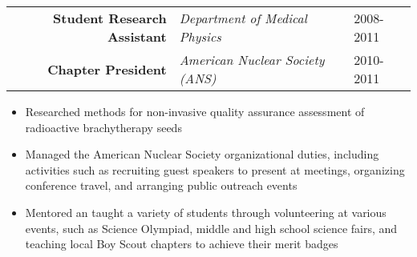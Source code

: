 
\begin{minipage}{\textwidth}
	\begin{center}
		\begin{tabular}{rll}
			\textbf{Student Research Assistant} & \textit{Department of Medical Physics} & 2008-2011 \\
			\textbf{Chapter President} & \textit{American Nuclear Society (ANS)} & 2010-2011 \\
		\end{tabular}
	\end{center}
\end{minipage}

\begin{minipage}{\textwidth}
	\begin{itemize}
		\item Researched methods for non-invasive quality assurance assessment of radioactive brachytherapy seeds
		\item Managed the American Nuclear Society organizational duties, including activities such as recruiting guest speakers to present at meetings,
			organizing conference travel, and arranging public outreach events
		\item Mentored an taught a variety of students through volunteering at various events, such as Science Olympiad, middle and 
			high school science fairs, and teaching local Boy Scout chapters to achieve their merit badges
	\end{itemize}
\end{minipage}
